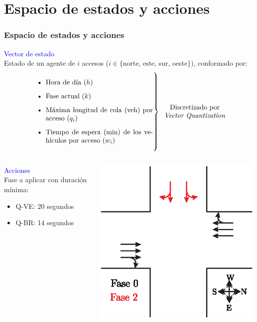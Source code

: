 \documentclass[11pt]{beamer}
\begin{document}
\section{Espacio de estados y acciones}
\begin{frame}
\frametitle{Espacio de estados y acciones}
\textcolor{blue}{Vector de estado}\\
Estado de un agente de $i$ accesos ($i \in \{$norte, este, sur, oeste$\}$), conformado por:
\begin{equation*}
\begin{rcases}
\parbox{18em}{\begin{itemize}
\item Hora de día ($h$)
\item Fase actual ($k$)
\item Máxima longitud de cola (veh) por acceso ($q_i$)
\item Tiempo de espera (min) de los vehículos por acceso ($w_i$)
\end{itemize}}
\end{rcases}
\parbox{10em}{\begin{center}
Discretizado por \textit{Vector Quantization}
\end{center} }
\end{equation*}
\medskip

\begin{columns}[T]
\begin{column}{.5\textwidth}
\textcolor{blue}{Acciones}\\
Fase a aplicar con duración mínima:
\begin{itemize}
\item Q-VE: 20 segundos
\item Q-BR: 14 segundos
\end{itemize}
\end{column}
\begin{column}{.5\textwidth}
\includegraphics[scale=0.55]{./graficas/ejFases.eps}
\end{column}
\end{columns}
\end{frame}
\end{document}
